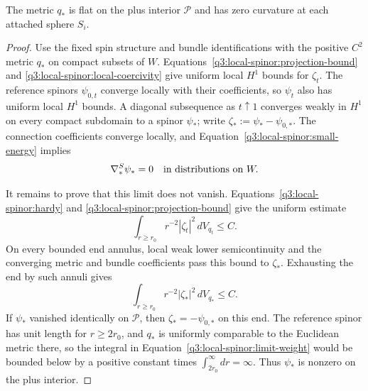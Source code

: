 \begin{proposition}
\label{q3:local-spinor:flatness}
The metric $q_*$ is flat on the plus interior $\mathcal P$ and
has zero curvature at each attached sphere $S_i$.
\end{proposition}

\begin{proof}
Use the fixed spin structure and bundle identifications with the
positive $C^2$ metric $q_*$ on compact subsets of $W$.
Equations~\eqref{q3:local-spinor:projection-bound} and
\eqref{q3:local-spinor:local-coercivity} give uniform local $H^1$ bounds
for $\zeta_t$.  The reference spinors $\psi_{0,t}$ converge
locally with their coefficients, so $\psi_t$ also has uniform
local $H^1$ bounds.  A diagonal subsequence as $t\uparrow1$
converges weakly in $H^1$ on every compact subdomain to a
spinor $\psi_*$; write
$\zeta_*:=\psi_*-\psi_{0,*}$.
The connection coefficients converge locally, and
Equation~\eqref{q3:local-spinor:small-energy} implies
\begin{equation}\label{q3:local-spinor:parallel-limit}
 \nabla^S_*\psi_*=0
 \quad\hbox{in distributions on }W.
\end{equation}

It remains to prove that this limit does not vanish.
Equations~\eqref{q3:local-spinor:hardy} and
\eqref{q3:local-spinor:projection-bound} give the uniform estimate
\[
 \int_{r\ge r_0}r^{-2}|\zeta_t|^2\,dV_{q_t}\le C.
\]
On every bounded end annulus, local weak lower semicontinuity
and the converging metric and bundle coefficients pass this
bound to $\zeta_*$.  Exhausting the end by such annuli gives
\begin{equation}\label{q3:local-spinor:limit-weight}
 \int_{r\ge r_0}r^{-2}|\zeta_*|^2\,dV_{q_*}\le C.
\end{equation}
If $\psi_*$ vanished identically on $\mathcal P$, then
$\zeta_*=-\psi_{0,*}$ on this end.  The reference spinor has
unit length for $r\ge2r_0$, and $q_*$ is uniformly comparable
to the Euclidean metric there, so the integral in
Equation~\eqref{q3:local-spinor:limit-weight} would be bounded below
by a positive constant times $\int_{2r_0}^{\infty}dr=\infty$.
Thus $\psi_*$ is nonzero on the plus interior.


\end{proof}
